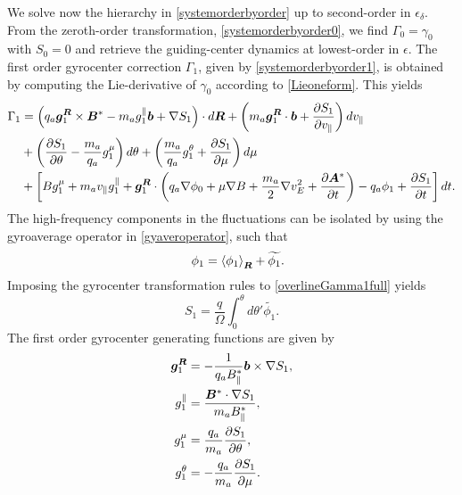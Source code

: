 We solve now the hierarchy in \cref{systemorderbyorder} up to second-order in $\epsilon_\delta$.
%
From the zeroth-order transformation, \cref{systemorderbyorder0}, we find ${\Gamma}_0 = \gamma_0$ with $S_0 =0$ and retrieve the guiding-center dynamics at lowest-order in $\epsilon$.
%
The first order gyrocenter correction ${\Gamma}_1$, given by \cref{systemorderbyorder1}, is obtained by computing the Lie-derivative of $\gamma_0$ according to \cref{Lieoneform}.
%
This yields
%
\begin{equation} \label{overlineGamma1full}
\begin{aligned}
{\Gamma}_{1}& = \left( q_a\bm{g}^{\bm{R}}_1 \times \bm{B}^*- m_a g^{\parallel}_1 \bm{b} + \nabla S_1 \right) \cdot d \bm{R} +
 \left( m_a \bm{g}^{\bm{R}}_1 \cdot \bm{b}  + \frac{\partial S_1}{\partial v_{\parallel}} \right) d v_\parallel  \\
& +  \left(
 \frac{\partial S_1}{\partial \theta} - \frac{m_a}{q_a } g^{\mu}_1  \right) d \theta +
\left( \frac{m_a  }{q_a }g^{\theta}_1 + \frac{\partial S_1}{\partial \mu}    \right) d \mu  \\ 
&+ \left[   B g^{\mu}_1 + m_a
  v_\parallel g^{\parallel}_1 + \bm{g}^{\bm{R}}_1 \cdot \left( q_a \nabla \phi_0 + \mu \nabla B + \frac{m_a}{2 }   \nabla v_E^2      + \frac{\partial \bm{A}^*}{\partial t } \right)  - q_a \phi_1  + \frac{\partial S_1}{\partial t}\right] d t.
\end{aligned}
\end{equation}
%
The high-frequency components in the fluctuations can be isolated by using the gyroaverage operator in \cref{gyaveroperator}, such that
%
\begin{equation} \label{gyaverandwidetilde}
\quad \phi_1 = \left< \phi_1  \right>_{\bm{R}} + \widetilde{\phi_1}.
\end{equation}
%
Imposing the gyrocenter transformation rules to \cref{overlineGamma1full} yields
%
\begin{equation}
    S_1 = \frac{q}{\Omega}\int_0^\theta d \theta' \widetilde{\phi_1}.
\end{equation}
%
The first order gyrocenter generating functions are given by
%
\begin{equation} \label{GYG1}
    \begin{aligned}
        \bm{g}^{\bm{R}}_1 &= - \frac{1}{q_a B_{\parallel}^*}\bm{b} \times  \nabla S_1,\\
        g^{\parallel}_1 &= \frac{\bm{B}^* \cdot \nabla S_1}{m_a B_{\parallel}^*},\\
        g^{\mu}_1 &=  \frac{q_a}{m_a}\frac{\partial S_1}{\partial \theta}, \\
        g^{\theta}_1 &= - \frac{q_a}{m_a} \frac{\partial S_1}{\partial \mu}.
    \end{aligned}
\end{equation}
